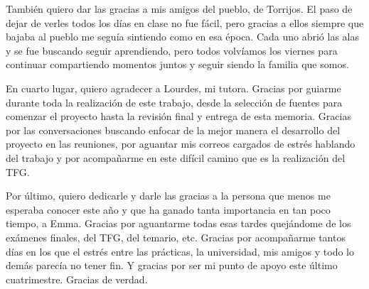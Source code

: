 \documentclass[12pt]{report} %
\renewcommand{\_}{\oldunderscore\allowbreak}
\begin{document}
También quiero dar las gracias a mis amigos del pueblo, de Torrijos. El paso de dejar de verles todos los días en clase no fue fácil, pero gracias a ellos siempre que bajaba al pueblo me seguía sintiendo como en esa época. Cada uno abrió las alas y se fue buscando seguir aprendiendo, pero todos volvíamos los viernes para continuar compartiendo momentos juntos y seguir siendo la familia que somos. 

En cuarto lugar, quiero agradecer a Lourdes, mi tutora. Gracias por guiarme durante toda la realización de este trabajo, desde la selección de fuentes para comenzar el proyecto hasta la revisión final y entrega de esta memoria. Gracias por las conversaciones buscando enfocar de la mejor manera el desarrollo del proyecto en las reuniones, por aguantar mis correos cargados de estrés hablando del trabajo y por acompañarme en este difícil camino que es la realización del TFG.

Por último, quiero dedicarle y darle las gracias a la persona que menos me esperaba conocer este año y que ha ganado tanta importancia en tan poco tiempo, a Emma. Gracias por aguantarme todas esas tardes quejándome de los exámenes finales, del TFG, del temario, etc. Gracias por acompañarme tantos días en los que el estrés entre las prácticas, la universidad, mis amigos y todo lo demás parecía no tener fin. Y gracias por ser mi punto de apoyo este último cuatrimestre. Gracias de verdad.
\setcounter{page}{5}
	
		
	\vfill
	
	\newpage %
	\thispagestyle{empty}
	\mbox{}
	


\tableofcontents
\thispagestyle{fancy}

\newpage %
\thispagestyle{empty}
\mbox{}

\listoffigures
\thispagestyle{fancy}

\newpage %
\thispagestyle{empty}
\mbox{}

\listoftables
\thispagestyle{fancy}

\newpage %
\thispagestyle{empty}
\mbox{}


\clearpage
{} %
\end{document}
